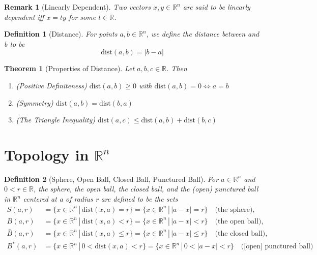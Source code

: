 \documentclass[11pt, oneside]{book}
\theoremstyle{break}
\newtheorem{thm}{Theorem}[section]
\newtheorem*{remark}{Remark}
\newtheorem{defn}{Definition}[section]
\newcommand{\bb}[1]{\mathbb{#1}}		%
\begin{document}
\begin{remark}[Linearly Dependent]
	Two vectors $x, y \in \bb{R}^n$ are said to be linearly dependent iff $x = ty$ for some $t \in \bb{R}$.
\end{remark}

\begin{defn}[Distance]
	For points $a, b \in \bb{R}^n$, we define the distance between and b to be
	\begin{equation*}
		\text{dist}(a, b) = |b - a|
	\end{equation*}
\end{defn}

\begin{thm}[Properties of Distance]
	Let $a, b, c \in \bb{R}$. Then
	\begin{enumerate}
		\item (Positive Definiteness) $\text{dist}(a, b) \geq 0$ with $\text{dist}(a, b) = 0 \iff a = b$
		\item (Symmetry) $\text{dist}(a, b) = \text{dist}(b, a)$
		\item (The Triangle Inequality) $\text{dist}(a, c) \leq \text{dist}(a, b) + \text{dist}(b, c)$
	\end{enumerate}
\end{thm}


\section{Topology in \texorpdfstring{$\bb{R}^n$}{Rn}}

\begin{defn}[Sphere, Open Ball, Closed Ball, Punctured Ball]
	For $a \in \bb{R}^n$ and $0 < r \in \bb{R}$, the sphere, the open ball, the closed ball, and the (open) punctured ball in $\bb{R}^n$ centered at a of radius r are defined to be the sets
	\begin{align*}
		S(a, r) 	  &= \{x \in \bb{R}^n \, | \, \text{dist}(x, a) = r \} = \{x \in \bb{R}^n \, | \, |a - x| = r\} \quad \text{(the sphere)}, \\
		B(a, r) 	  &= \{x \in \bb{R}^n \, | \, \text{dist}(x, a) < r \} = \{x \in \bb{R}^n \, | \, |a - x| < r\} \quad \text{(the open ball)}, \\
		\bar{B}(a, r) &= \{x \in \bb{R}^n \, | \, \text{dist}(x, a) \leq r \} = \{x \in \bb{R}^n \, | \, |a - x| \leq r\} \quad \text{(the closed ball)}, \\
		B^*(a, r)	  &= \{x \in \bb{R}^n \, | \, 0 < \text{dist}(x, a) < r \} = \{x \in \bb{R}^n \, | \, 0 < |a - x| < r\} \quad \text{([open] punctured ball)}
	\end{align*}
\end{defn}
\end{document}
